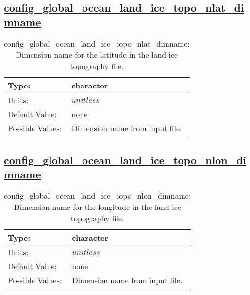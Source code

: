 \subsection[config\_global\_ocean\_land\_ice\_topo\_nlat\_dimname]{\hyperref[sec:nm_tab_global_ocean]{config\_global\_ocean\_land\_ice\_topo\_nlat\_dimname}}
\label{subsec:nm_sec_config_global_ocean_land_ice_topo_nlat_dimname}
\begin{center}
\begin{longtable}{| p{2.0in} || p{4.0in} |}
    \hline
    Type: & character \\
    \hline
    Units: & $unitless$ \\
    \hline
    Default Value: & none \\
    \hline
    Possible Values: & Dimension name from input file. \\
    \hline
    \caption{config\_global\_ocean\_land\_ice\_topo\_nlat\_dimname: Dimension name for the latitude in the land ice topography file.}
\end{longtable}
\end{center}
\subsection[config\_global\_ocean\_land\_ice\_topo\_nlon\_dimname]{\hyperref[sec:nm_tab_global_ocean]{config\_global\_ocean\_land\_ice\_topo\_nlon\_dimname}}
\label{subsec:nm_sec_config_global_ocean_land_ice_topo_nlon_dimname}
\begin{center}
\begin{longtable}{| p{2.0in} || p{4.0in} |}
    \hline
    Type: & character \\
    \hline
    Units: & $unitless$ \\
    \hline
    Default Value: & none \\
    \hline
    Possible Values: & Dimension name from input file. \\
    \hline
    \caption{config\_global\_ocean\_land\_ice\_topo\_nlon\_dimname: Dimension name for the longitude in the land ice topography file.}
\end{longtable}
\end{center}
